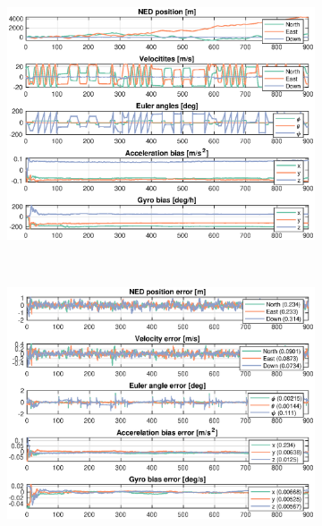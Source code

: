 \begin{figure}[ht]
    \centering
	\begin{subfigure}[b]{0.45\textwidth}
		\includegraphics[width=\textwidth]{figures/ga_2/sim_state}
		\caption{}
		\label{fig:ga_2_sim_state}
	\end{subfigure}%
       ~
	\begin{subfigure}[b]{0.45\textwidth}
		\includegraphics[width=\textwidth]{figures/ga_2/sim_errors}
		\caption{}
		\label{fig:ga_2_sim_errors}
	\end{subfigure}
    \label{fig:ga_2_sim_state_errors} 
\end{figure}


